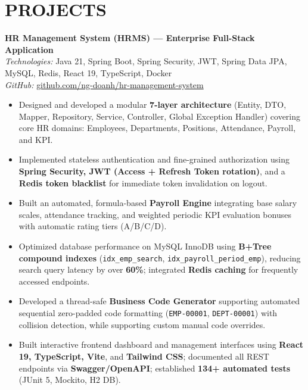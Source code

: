 ﻿\documentclass[10pt,a4paper]{article}
\begin{document}
\section*{PROJECTS}

\noindent
\textbf{HR Management System (HRMS) --- Enterprise Full-Stack Application} \hfill {} \\
\textit{Technologies:} Java 21, Spring Boot, Spring Security, JWT, Spring Data JPA, MySQL, Redis, React 19, TypeScript, Docker \\
\textit{GitHub:} \href{https://github.com/ng-doanh/hr-management-system}{github.com/ng-doanh/hr-management-system}
\begin{itemize}
    \item Designed and developed a modular \textbf{7-layer architecture} (Entity, DTO, Mapper, Repository, Service, Controller, Global Exception Handler) covering core HR domains: Employees, Departments, Positions, Attendance, Payroll, and KPI.
    \item Implemented stateless authentication and fine-grained authorization using \textbf{Spring Security, JWT (Access + Refresh Token rotation)}, and a \textbf{Redis token blacklist} for immediate token invalidation on logout.
    \item Built an automated, formula-based \textbf{Payroll Engine} integrating base salary scales, attendance tracking, and weighted periodic KPI evaluation bonuses with automatic rating tiers (A/B/C/D).
    \item Optimized database performance on MySQL InnoDB using \textbf{B+Tree compound indexes} (\texttt{idx\_emp\_search}, \texttt{idx\_payroll\_period\_emp}), reducing search query latency by over \textbf{60\%}; integrated \textbf{Redis caching} for frequently accessed endpoints.
    \item Developed a thread-safe \textbf{Business Code Generator} supporting automated sequential zero-padded code formatting (\texttt{EMP-00001}, \texttt{DEPT-00001}) with collision detection, while supporting custom manual code overrides.
    \item Built interactive frontend dashboard and management interfaces using \textbf{React 19, TypeScript, Vite}, and \textbf{Tailwind CSS}; documented all REST endpoints via \textbf{Swagger/OpenAPI}; established \textbf{134+ automated tests} (JUnit 5, Mockito, H2 DB).
\end{itemize}
\end{document}
